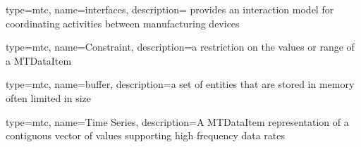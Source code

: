 {
  type=mtc,
  name=interfaces,
  description={\cite{MTCPart5} provides an interaction model for coordinating activities between manufacturing devices}
}

{
  type=mtc,
  name=Constraint,
  description={a restriction on the values or range of a \gls{MTDataItem}}
}

{
  type=mtc,
  name=buffer,
  description={a set of entities that are stored in memory often limited in size}
}

{
  type=mtc,
  name={Time Series},
  description={A \gls{MTDataItem} representation of a contiguous vector of values supporting high frequency data rates}
}


